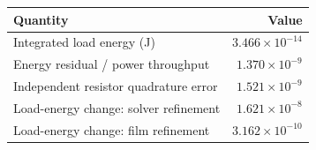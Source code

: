 \begin{tabular}{lr}\toprule Quantity & Value \\\midrule
Integrated load energy (J) & $3.466\times10^{-14}$ \\
Energy residual / power throughput & $1.370\times10^{-9}$ \\
Independent resistor quadrature error & $1.521\times10^{-9}$ \\
Load-energy change: solver refinement & $1.621\times10^{-8}$ \\
Load-energy change: film refinement & $3.162\times10^{-10}$ \\
\bottomrule\end{tabular}

